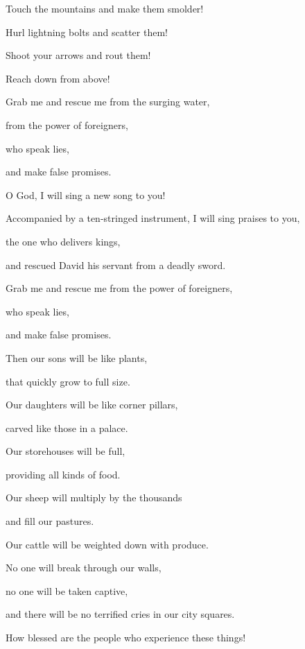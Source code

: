 {\par }{\Q Touch
the mountains
and make them smolder!
\par }{\Q {}Hurl
lightning
bolts and scatter
them!
\par }{\Q Shoot
your arrows and rout them!
\par }{\Q {}Reach
down from
above!
\par }{\Q Grab me and rescue
me from the surging
water,
\par }{\Q from the power
of foreigners,
\par }{\Q {}who
speak
lies,
\par }{\Q and make false promises.
\par }{\Q {}O God,
I will sing
a new
song
to you!
\par }{\Q Accompanied by a ten-stringed
instrument,
I will sing praises to you,
\par }{\Q {}the one who delivers
kings,
\par }{\Q and rescued David
his servant
from a deadly
sword.
\par }{\Q {}Grab
me and rescue
me from the power
of foreigners,
\par }{\Q who
speak
lies,
\par }{\Q and make false promises.
\par }{\Q {}Then
our sons
will be like plants,
\par }{\Q that quickly grow
to full size.

\par }{\Q Our daughters
will be like corner pillars,
\par }{\Q carved
like
those in a palace.
\par }{\Q {}Our storehouses
will be full,
\par }{\Q providing
all kinds
of food.

\par }{\Q Our sheep
will multiply
by the thousands
\par }{\Q and fill our pastures.
\par }{\Q {}Our cattle
will be weighted down
with produce.

\par }{\Q No one
will break through
our walls,
\par }{\Q no one
will be taken captive,
\par }{\Q and there will be no
terrified cries
in our city squares.
\par }{\Q {}How blessed
are the people
who experience these things!

}

